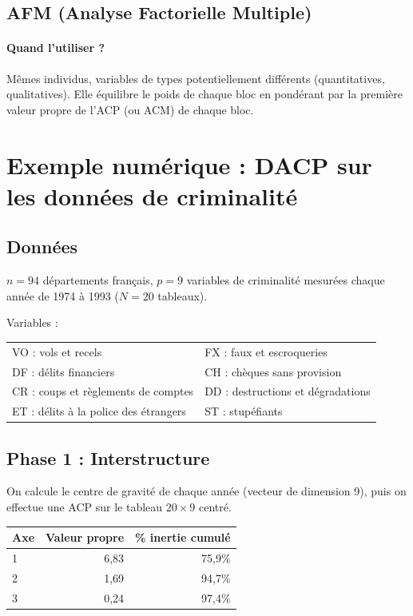 \documentclass[a4paper,11pt]{article}
\begin{document}
\subsection{AFM (Analyse Factorielle Multiple)}
\paragraph{Quand l'utiliser ?}
Mêmes individus, variables de types potentiellement différents (quantitatives, qualitatives). Elle équilibre le poids de chaque bloc en pondérant par la première valeur propre de l'ACP (ou ACM) de chaque bloc.

\section{Exemple numérique : DACP sur les données de criminalité}

\subsection{Données}
$n = 94$ départements français, $p = 9$ variables de criminalité mesurées chaque année de 1974 à 1993 ($N = 20$ tableaux).

Variables :
\begin{center}
\begin{tabular}{ll}
VO : vols et recels & FX : faux et escroqueries \\
DF : délits financiers & CH : chèques sans provision \\
CR : coups et règlements de comptes & DD : destructions et dégradations \\
ET : délits à la police des étrangers & ST : stupéfiants \\
\end{tabular}
\end{center}

\subsection{Phase 1 : Interstructure}

On calcule le centre de gravité de chaque année (vecteur de dimension 9), puis on effectue une ACP sur le tableau $20 \times 9$ centré.

\begin{center}
\begin{tabular}{lrr}
\hline
Axe & Valeur propre & \% inertie cumulé \\
\hline
1 & 6,83 & 75,9\% \\
2 & 1,69 & 94,7\% \\
3 & 0,24 & 97,4\% \\
\hline
\end{tabular}
\end{center}
\end{document}
